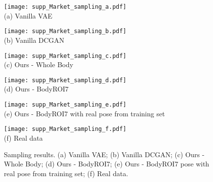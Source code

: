 \documentclass[10pt,twocolumn,letterpaper]{article}
\begin{document}
\begin{figure*} [htp]
\scriptsize
\begin{minipage}{0.33\textwidth}
\centering
  \centering
  \texttt{[image: supp\_Market\_sampling\_a.pdf]}\\
(a) Vanilla VAE
\vspace{1mm}
\end{minipage}
\hfill
\begin{minipage}{0.33\textwidth}
\centering
  \centering
  \texttt{[image: supp\_Market\_sampling\_b.pdf]}\\
(b) Vanilla DCGAN
\vspace{1mm}
\end{minipage}
\hfill
\begin{minipage}{0.33\textwidth}
\centering
  \centering
  \texttt{[image: supp\_Market\_sampling\_c.pdf]}\\
(c) Ours - Whole Body
\vspace{1mm}
\end{minipage}
\hfill
\begin{minipage}{0.33\textwidth}
\centering
  \centering
  \texttt{[image: supp\_Market\_sampling\_d.pdf]}\\
(d) Ours - BodyROI7
\end{minipage}
\hfill
\begin{minipage}{0.33\textwidth}
\centering
  \centering
  \texttt{[image: supp\_Market\_sampling\_e.pdf]}\\
(e) Ours - BodyROI7 with real pose from training set
\end{minipage}
\hfill
\begin{minipage}{0.33\textwidth}
\centering
  \centering
  \texttt{[image: supp\_Market\_sampling\_f.pdf]}\\
(f) Real data
\end{minipage}
\caption{Sampling results. (a) Vanilla VAE; (b) Vanilla DCGAN; (c) Ours - Whole Body; (d) Ours - BodyROI7; (e) Ours - BodyROI7 pose with real pose from training set; (f) Real data. }
\label{fig:supp_Market_sampling}
\end{figure*}
 
\end{document}
